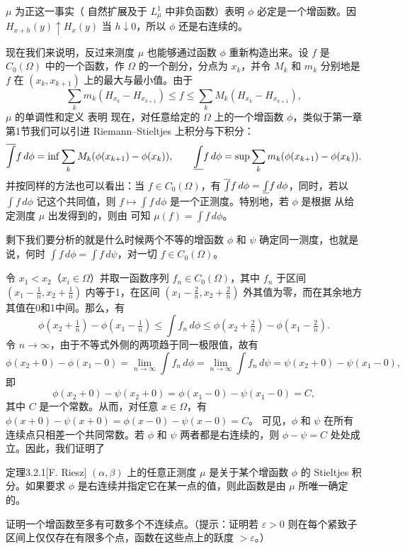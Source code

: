 $\mu$ 为正这一事实（ 自然扩展及于 $L^1_\mu$ 中非负函数）表明 $\phi$ 必定是一个增函数。因 $H_{x+h}(y)\uparrow H_x(y)$ 当 $h\downarrow0$，所以 $\phi$ 还是右连续的。

现在我们来说明，反过来测度 $\mu$ 也能够通过函数 $\phi$ 重新构造出来。设 $f$ 是 $C_0(\Omega)$ 中的一个函数，作 $\Omega$ 的一个剖分，分点为 $x_k$，并令 $M_k$ 和 $m_k$ 分别地是 $f$ 在 $(x_k,x_{k+1})$ 上的最大与最小值。由于
\[\sum_km_k(H_{x_k}-H_{x_{k+1}})\le f\le\sum_kM_k(H_{x_k}-H_{x_{k+1}}),\]
$\mu$ 的单调性和定义  表明
现在，对任意给定的 $\Omega$ 上的一个增函数 $\phi$，类似于第一章第1节我们可以引进 Riemann--Stieltjes 上积分与下积分：
\[\overline{\int} f\,d\phi=\inf\sum_kM_k(\phi(x_{k+1})-\phi(x_k)),\qquad\underline{\int} f\,d\phi=\sup\sum_km_k(\phi(x_{k+1})-\phi(x_k)).\]
并按同样的方法也可以看出：当 $f\in C_0(\Omega)$，有 $\overline{\int} f\,d\phi=\underline{\int} f\,d\phi$，同时，若以 $\int f\,d\phi$ 记这个共同值，则 $f\mapsto\int f\,d\phi$ 是一个正测度。特别地，若 $\phi$ 是根据  从给定测度 $\mu$ 出发得到的，则由  可知 $\mu(f)=\int f\,d\phi$。

剩下我们要分析的就是什么时候两个不等的增函数 $\phi$ 和 $\psi$ 确定同一测度，也就是说，何时 $\int f\,d\phi=\int f\,d\psi$，对一切 $f\in C_0(\Omega)$。

令 $x_1<x_2$（$x_i\in\Omega$）并取一函数序列 $f_n\in C_0(\Omega)$，其中 $f_n$ 于区间 $(x_1-\frac1n,x_2+\frac1n)$ 内等于1，在区间 $(x_1-\frac2n,x_2+\frac2n)$ 外其值为零，而在其余地方其值在0和1中间。那么，有
\[\phi(x_2+\tfrac1n)-\phi(x_1-\tfrac1n)\le\int f_n\,d\phi\le\phi(x_2+\tfrac2n)-\phi(x_1-\tfrac2n).\]
令 $n\to\infty$，由于不等式外侧的两项趋于同一极限值，故有
\[\phi(x_2+0)-\phi(x_1-0)=\lim_{n\to\infty}\int f_n\,d\phi=\lim_{n\to\infty}\int f_n\,d\psi=\psi(x_2+0)-\psi(x_1-0),\]
即
\[\phi(x_2+0)-\psi(x_2+0)=\phi(x_1-0)-\psi(x_1-0)=C,\]
其中 $C$ 是一个常数。从而，对任意 $x\in\Omega$，有 $\phi(x+0)-\psi(x+0)=\phi(x-0)-\psi(x-0)=C$。
可见，$\phi$ 和 $\psi$ 在所有连续点只相差一个共同常数。若 $\phi$ 和 $\psi$ 两者都是右连续的，则 $\phi-\psi=C$ 处处成立。因此，我们证明了
\begin{statement}{定理}{3.2.1}[F. Riesz]
$(\alpha,\beta)$ 上的任意正测度 $\mu$ 是关于某个增函数 $\phi$ 的 Stieltjes 积分。如果要求 $\phi$ 是右连续并指定它在某一点的值，则此函数是由 $\mu$ 所唯一确定的。
\end{statement}
\Exercise 证明一个增函数至多有可数多个不连续点。（提示：证明若 $\varepsilon>0$ 则在每个紧致子区间上仅仅存在有限多个点，函数在这些点上的跃度 $>\varepsilon$。）

